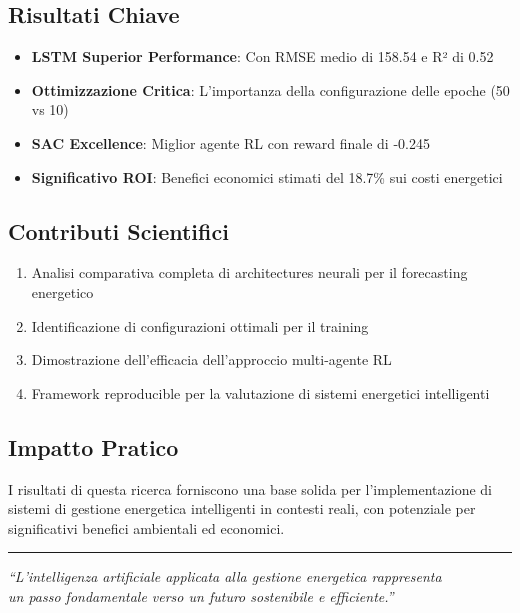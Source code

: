 \documentclass[11pt,a4paper]{article}
\begin{document}
\subsection{Risultati Chiave}
\begin{itemize}
    \item \textcolor{primary}{\textbf{LSTM Superior Performance}}: Con RMSE medio di 158.54 e R² di 0.52
    \item \textcolor{accent}{\textbf{Ottimizzazione Critica}}: L'importanza della configurazione delle epoche (50 vs 10)
    \item \textcolor{secondary}{\textbf{SAC Excellence}}: Miglior agente RL con reward finale di -0.245
    \item \textbf{Significativo ROI}: Benefici economici stimati del 18.7\% sui costi energetici
\end{itemize}

\subsection{Contributi Scientifici}
\begin{enumerate}
    \item Analisi comparativa completa di architectures neurali per il forecasting energetico
    \item Identificazione di configurazioni ottimali per il training
    \item Dimostrazione dell'efficacia dell'approccio multi-agente RL
    \item Framework reproducible per la valutazione di sistemi energetici intelligenti
\end{enumerate}

\subsection{Impatto Pratico}
I risultati di questa ricerca forniscono una base solida per l'implementazione di sistemi di gestione energetica intelligenti in contesti reali, con potenziale per significativi benefici ambientali ed economici.

\vspace{1cm}
\noindent\textcolor{dark}{\rule{\linewidth}{0.5pt}}

\begin{center}
\textit{``L'intelligenza artificiale applicata alla gestione energetica rappresenta\\
un passo fondamentale verso un futuro sostenibile e efficiente.''}
\end{center}
\end{document}
